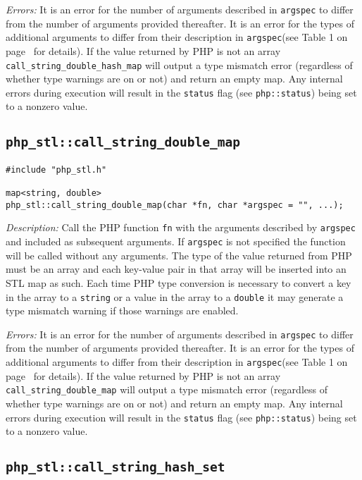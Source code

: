 \documentclass[11pt,titlepage]{article}
\begin{document}
\emph{Errors:} It is an error for the number of arguments described in \verb|argspec| to differ from the number of arguments provided thereafter. It is an error for the types of additional arguments to differ from their description in \verb|argspec|(see Table 1 on page~\pageref{Table1} for details). If the value returned by PHP is not an array \verb|call_string_double_hash_map| will output a type mismatch error (regardless of whether type warnings are on or not) and return an empty map. Any internal errors during execution will result in the \verb|status| flag (see \verb|php::status|) being set to a nonzero value.


\subsection{\texttt{php\_stl::call\_string\_double\_map}}

\begin{verbatim}
#include "php_stl.h"

map<string, double> 
php_stl::call_string_double_map(char *fn, char *argspec = "", ...);
\end{verbatim}

\emph{Description:} Call the PHP function \verb|fn| with the arguments described by \verb|argspec| and included as subsequent arguments. If \verb|argspec| is not specified the function will be called without any arguments. The type of the value returned from PHP must be an array and each key-value pair in that array will be inserted into an STL map as such. Each time PHP type conversion is necessary to convert a key in the array to a \verb|string| or a value in the array to a \verb|double| it may generate a type mismatch warning if those warnings are enabled.

\emph{Errors:} It is an error for the number of arguments described in \verb|argspec| to differ from the number of arguments provided thereafter. It is an error for the types of additional arguments to differ from their description in \verb|argspec|(see Table 1 on page~\pageref{Table1} for details). If the value returned by PHP is not an array \verb|call_string_double_map| will output a type mismatch error (regardless of whether type warnings are on or not) and return an empty map. Any internal errors during execution will result in the \verb|status| flag (see \verb|php::status|) being set to a nonzero value.


\subsection{\texttt{php\_stl::call\_string\_hash\_set}}
\end{document}
